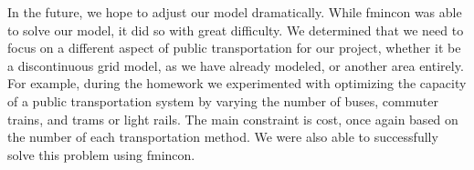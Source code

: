 \documentclass{article}
\begin{document}
In the future, we hope to adjust our model dramatically. While fmincon was able to solve our model, it did so with great difficulty. We determined that we need to focus on a different aspect of public transportation for our project, whether it be a discontinuous grid model, as we have already modeled, or another area entirely. For example, during the homework we experimented with optimizing the capacity of a public transportation system by varying the number of buses, commuter trains, and trams or light rails. The main constraint is cost, once again based on the number of each transportation method. We were also able to successfully solve this problem using fmincon.
\end{document}
